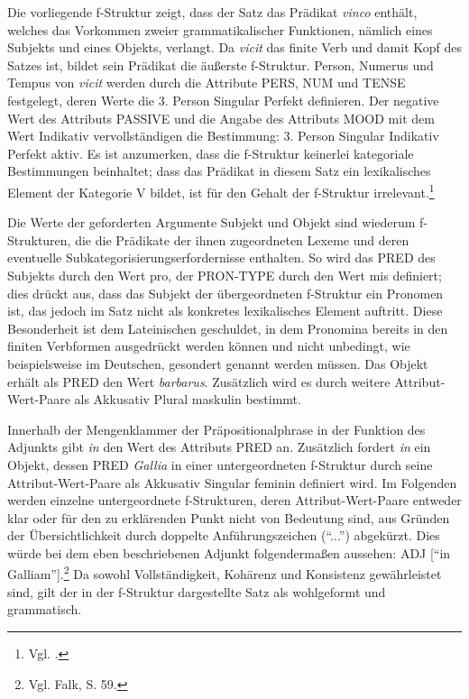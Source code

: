 \documentclass[12pt,a4paper]{article}
\begin{document}
Die vorliegende f-Struktur zeigt, dass der Satz das Prädikat \textit{vinco} enthält, welches das Vorkommen zweier grammatikalischer Funktionen, nämlich eines Subjekts und eines Objekts, verlangt. Da \textit{vicit} das finite Verb und damit Kopf des Satzes ist, bildet sein Prädikat die äußerste f-Struktur. Person, Numerus und Tempus von \textit{vicit} werden durch die Attribute  PERS, NUM und TENSE festgelegt, deren Werte die 3. Person Singular Perfekt definieren. Der negative Wert des Attributs PASSIVE und die Angabe des Attributs MOOD mit dem Wert Indikativ vervollständigen die Bestimmung: 3. Person Singular Indikativ Perfekt aktiv. Es ist anzumerken, dass die f-Struktur keinerlei kategoriale Bestimmungen beinhaltet; dass das Prädikat in diesem Satz ein lexikalisches Element der Kategorie V bildet, ist für den Gehalt der f-Struktur irrelevant.\footnote{Vgl. \cite[7]{Skript}.}

Die Werte der geforderten Argumente Subjekt und Objekt sind wiederum f-Strukturen, die die Prädikate der ihnen zugeordneten Lexeme und deren eventuelle Subkategorisierungserfordernisse enthalten. So wird das PRED des Subjekts durch den Wert pro, der PRON-TYPE durch den Wert mis definiert; dies drückt aus, dass das Subjekt der übergeordneten f-Struktur ein Pronomen ist, das jedoch im Satz nicht als konkretes lexikalisches Element auftritt. Diese Besonderheit ist dem Lateinischen geschuldet, in dem Pronomina bereits in den finiten Verbformen ausgedrückt werden können und nicht unbedingt, wie beispielsweise im Deutschen, gesondert genannt werden müssen. Das Objekt erhält als PRED den Wert \textit{barbarus}. Zusätzlich wird es durch weitere Attribut-Wert-Paare als Akkusativ Plural maskulin bestimmt.

Innerhalb der Mengenklammer der Präpositionalphrase in der Funktion des Adjunkts gibt \textit{in} den Wert des Attributs PRED an. Zusätzlich fordert \textit{in} ein Objekt, dessen PRED \textit{Gallia} in einer untergeordneten f-Struktur durch seine Attribut-Wert-Paare als Akkusativ Singular feminin definiert wird. Im Folgenden werden einzelne untergeordnete f-Strukturen, deren Attribut-Wert-Paare entweder klar oder für den zu erklärenden Punkt nicht von Bedeutung sind, aus Gründen der Übersichtlichkeit durch doppelte Anführungszeichen (``...'') abgekürzt. Dies würde bei dem eben beschriebenen Adjunkt folgendermaßen aussehen: ADJ [“in Galliam''].\footnote{Vgl. Falk, S. 59.}
Da sowohl Vollständigkeit, Kohärenz und Konsistenz gewährleistet sind, gilt der in der f-Struktur dargestellte Satz als wohlgeformt und grammatisch.
\end{document}
